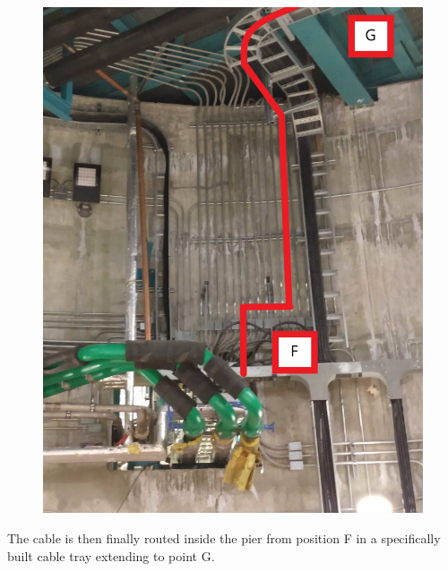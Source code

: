\begin{figure}
  \centering
  \includegraphics[width=20cm]{images/19.jpg}
\end{figure}
  
\newpage 

  The cable is then finally routed inside the pier from position F in a specifically built cable tray extending to point G.

